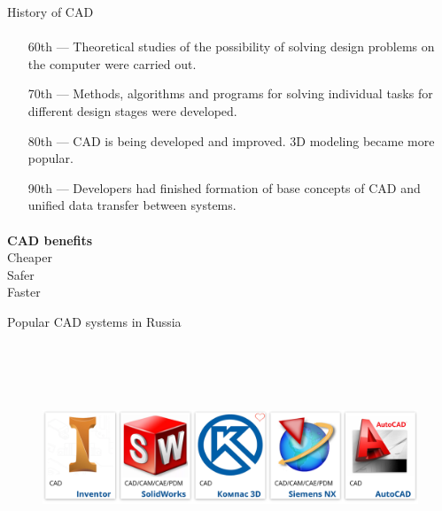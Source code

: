 \documentclass[aspectratio=169]{beamer}
\begin{document}
    \begin{frame}[t]{History of CAD}
    \framesubtitle{}
        \begin{itemize}
            \item[60th] --- Theoretical studies of the possibility of solving design problems on the computer were carried out.
            \item[70th] --- Methods, algorithms and programs for solving individual tasks for different design stages were developed.
            \item[80th] --- CAD is being developed and improved. 3D modeling became more popular.
            \item[90th] --- Developers had finished formation of base concepts of CAD and unified data transfer between systems.
        \end{itemize}
    \end{frame}
    
    \begin{frame}[c]{}
        \framesubtitle{}
            \LARGE\centering
            \textbf{CAD benefits}\\
            \medskip
            Cheaper\\
            Safer \\
            Faster
        \end{frame}
    
    \begin{frame}[c]{Popular CAD systems in Russia}
    \framesubtitle{}
        \vspace{-0.6cm}
        \begin{figure}[H]
            \centering\includegraphics[height=6.5cm,width=1\textwidth,keepaspectratio]{resources/CADs.png}
            \label{fig:resources/CADs.png}
        \end{figure}
    \end{frame}
    
\end{document}

